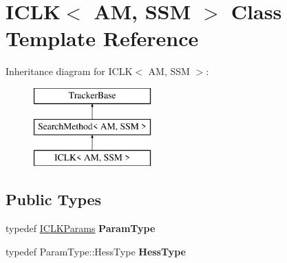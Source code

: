 \hypertarget{classICLK}{\section{I\-C\-L\-K$<$ A\-M, S\-S\-M $>$ Class Template Reference}
\label{classICLK}
}
Inheritance diagram for I\-C\-L\-K$<$ A\-M, S\-S\-M $>$\-:\begin{figure}[H]
\begin{center}
\leavevmode
\includegraphics[height=3.000000cm]{classICLK}
\end{center}
\end{figure}
\subsection*{Public Types}
\begin{DoxyCompactItemize}
\item 
\hypertarget{classICLK_ac9497f5d15d1f31253f4426e2a3f7117}{typedef \hyperlink{structICLKParams}{I\-C\-L\-K\-Params} {\bfseries Param\-Type}}\label{classICLK_ac9497f5d15d1f31253f4426e2a3f7117}

\item 
\hypertarget{classICLK_aa06240a7f337a177e44b2c0a31740bcc}{typedef Param\-Type\-::\-Hess\-Type {\bfseries Hess\-Type}}\label{classICLK_aa06240a7f337a177e44b2c0a31740bcc}

\end{DoxyCompactItemize}
